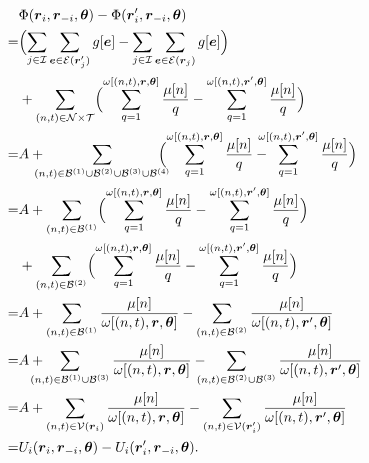 \documentclass[journal]{IEEEtran}
\newcommand{\mc}[1]{\mathcal{#1}}
\newcommand{\bs}[1]{\boldsymbol{#1}}
\begin{document}
\begin{align} 
   & \Phi(\boldsymbol{r}_i, \boldsymbol{r}_{-i}, \boldsymbol{\theta}) - \Phi(\boldsymbol{r}_i', \boldsymbol{r}_{-i}, \boldsymbol{\theta}) \nonumber  \\ 
= & \Bigl(\sum_{j \in \mathcal{I}} \sum_{\boldsymbol{e} \in \mathcal{E}(\boldsymbol{r}_j')} g[\boldsymbol{e}] - \sum_{j \in \mathcal{I}} \sum_{\boldsymbol{e} \in \mathcal{E}(\boldsymbol{r}_j)} g[\boldsymbol{e}] \Bigr) \nonumber \\ 
	& +  \sum_{(n,t) \in \mathcal{N} \times \mathcal{T}} \Bigl( \sum_{q=1}^{\omega[(n,t), \boldsymbol{r}, \boldsymbol{\theta}]} \frac{\mu[n]}{q} - \sum_{q=1}^{\omega[(n,t), \boldsymbol{r}', \boldsymbol{\theta}]} \frac{\mu[n]}{q}  \Bigr) \nonumber \\ 
=  & A + \hspace{-0.3cm} \sum_{(n,t) \in \mathcal{B}^{(1)} \cup \mathcal{B}^{(2)} \cup \mathcal{B}^{(3)} \cup \mathcal{B}^{(4)}} \hspace{-0.3cm} \Bigl( \sum_{q=1}^{\omega[(n,t), \boldsymbol{r}, \boldsymbol{\theta}]} \frac{\mu[n]}{q} - \hspace{-0.3cm} \sum_{q=1}^{\omega[(n,t), \boldsymbol{r}', \boldsymbol{\theta}]} \frac{\mu[n]}{q} \Bigr) \nonumber \\ 
=  & A + \sum_{(n,t) \in \mathcal{B}^{(1)}} \Bigl( \sum_{q=1}^{\omega[(n,t), \boldsymbol{r}, \boldsymbol{\theta}]} \frac{\mu[n]}{q} - \sum_{q=1}^{\omega[(n,t), \boldsymbol{r}', \boldsymbol{\theta}]} \frac{\mu[n]}{q} \Bigr) \nonumber \\ 
	& + \sum_{(n,t) \in \mathcal{B}^{(2)}} \Bigl( \sum_{q=1}^{\omega[(n,t), \boldsymbol{r}, \boldsymbol{\theta}]} \frac{\mu[n]}{q} - \sum_{q=1}^{\omega[(n,t), \boldsymbol{r}', \boldsymbol{\theta}]} \frac{\mu[n]}{q} \Bigr) \nonumber \\ 
=  & A + \sum_{(n,t) \in \mathcal{B}^{(1)}} \frac{\mu[n]}{\omega[(n,t), \boldsymbol{r}, \boldsymbol{\theta}]} - \sum_{(n,t) \in \mathcal{B}^{(2)}} \frac{\mu[n]}{\omega[(n,t), \boldsymbol{r}', \boldsymbol{\theta}]}  \nonumber \\ 
=  & A + \hspace{-0.4cm} \sum_{(n,t) \in \mathcal{B}^{(1)} \cup \mathcal{B}^{(3)}} \frac{\mu[n]}{\omega[(n,t), \boldsymbol{r}, \boldsymbol{\theta}]} - \hspace{-0.3cm} \sum_{(n,t) \in \mathcal{B}^{(2)} \cup \mathcal{B}^{(3)}} \frac{\mu[n]}{\omega[(n,t), \boldsymbol{r}', \boldsymbol{\theta}]}  \nonumber \\
=  & A + \sum_{(n,t) \in \mc{V}(\bs{r}_i)} \frac{\mu[n]}{\omega[(n,t), \boldsymbol{r}, \boldsymbol{\theta}]} - \sum_{(n,t) \in \mc{V}(\bs{r}_i')} \frac{\mu[n]}{\omega[(n,t), \boldsymbol{r}', \boldsymbol{\theta}]} \nonumber \\ 
=  & U_i(\boldsymbol{r}_i, \boldsymbol{r}_{-i}, \boldsymbol{\theta}) - U_i(\boldsymbol{r}_i', \boldsymbol{r}_{-i}, \boldsymbol{\theta}). 
\end{align}
\end{document}
